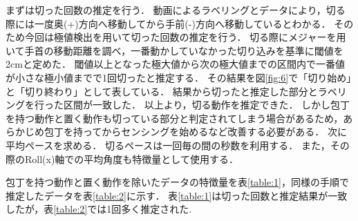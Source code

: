 まずは切った回数の推定を行う．
動画によるラベリングとデータにより，切る際には一度奥(+)方向へ移動してから手前(-)方向へ移動しているとわかる．
そのため今回は極値検出を用いて切った回数の推定を行う．
切る際にメジャーを用いて手首の移動距離を調べ，一番動かしていなかった切り込みを基準に閾値を2cmと定めた．
閾値以上となった極大値から次の極大値までの区間内で一番値が小さな極小値までで1回切ったと推定する．
その結果を図\ref{fig:6}で「切り始め」と「切り終わり」として表している．
結果から切ったと推定した部分とラベリングを行った区間が一致した．
以上より，切る動作を推定できた．
しかし包丁を持つ動作と置く動作も切っている部分と判定されてしまう場合があるため，あらかじめ包丁を持ってからセンシングを始めるなど改善する必要がある．
次に平均ペースを求める．
切るペースは一回毎の間の秒数を利用する．
また，その際のRoll(x)軸での平均角度も特徴量として使用する．

包丁を持つ動作と置く動作を除いたデータの特徴量を表\ref{table:1}，同様の手順で推定したデータを表\ref{table:2}に示す．
表\ref{table:1}は切った回数と推定結果が一致したが，表\ref{table:2}では1回多く推定された.
\begin{table}[ht]
    \centering
    \caption{1回目の特徴量}
    \label{table:1}
\end{table}

